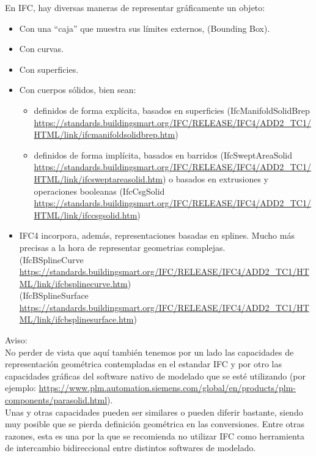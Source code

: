 \documentclass[spanish,10pt,a4paper,final,oneside]{article}
\begin{document}
En IFC, hay diversas maneras de representar gráficamente un objeto:
\begin{itemize}
\item Con una ``caja'' que muestra sus límites externos, (Bounding Box).

\item Con curvas.

\item Con superficies.

\item Con cuerpos sólidos, bien sean:
\begin{itemize}
\item definidos de forma explícita, basados en superficies (IfcManifoldSolidBrep \url{https://standards.buildingsmart.org/IFC/RELEASE/IFC4/ADD2_TC1/HTML/link/ifcmanifoldsolidbrep.htm})
\item definidos de forma implícita, basados en barridos (IfcSweptAreaSolid \url{https://standards.buildingsmart.org/IFC/RELEASE/IFC4/ADD2_TC1/HTML/link/ifcsweptareasolid.htm}) o basados en extrusiones y operaciones booleanas (IfcCsgSolid \url{https://standards.buildingsmart.org/IFC/RELEASE/IFC4/ADD2_TC1/HTML/link/ifccsgsolid.htm}) 
\end{itemize}

\item IFC4 incorpora, además, representaciones basadas en splines. Mucho más precisas a la hora de representar geometrias complejas.
\\(IfcBSplineCurve \url{https://standards.buildingsmart.org/IFC/RELEASE/IFC4/ADD2_TC1/HTML/link/ifcbsplinecurve.htm}) 
\\(IfcBSplineSurface \url{https://standards.buildingsmart.org/IFC/RELEASE/IFC4/ADD2_TC1/HTML/link/ifcbsplinesurface.htm})
\end{itemize}   

Aviso:
\\No perder de vista que aquí también tenemos por un lado las capacidades de representación geométrica contempladas en el estandar IFC y por otro las capacidades gráficas del software nativo de modelado que se esté utilizando (por ejemplo: \url{https://www.plm.automation.siemens.com/global/en/products/plm-components/parasolid.html}).
\\Unas y otras capacidades pueden ser similares o pueden diferir bastante, siendo muy posible que se pierda definición geométrica en las conversiones. Entre otras razones, esta es una por la que se recomienda no utilizar IFC como herramienta de intercambio bidireccional entre distintos softwares de modelado.
\end{document}
